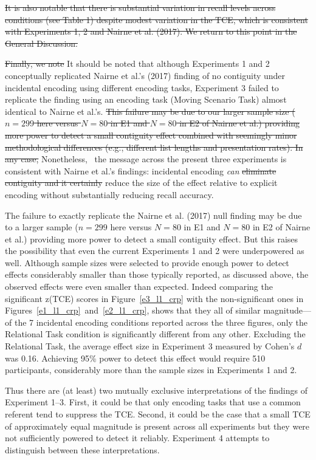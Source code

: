 \documentclass[man,natbib,floatsintext]{apa6} %
\begin{document}
\st{It is also notable that there is substantial variation in recall levels across conditions (see Table 1) despite modest variation in the TCE, which is consistent with Experiments 1, 2 and Nairne et al. (2017). We return to this point in the General Discussion.}

\st{Finally, we note} \color{red}It should be noted \color{black} that although Experiments 1 and 2 conceptually replicated Nairne et al.'s (2017) finding of no contiguity under incidental encoding using different encoding tasks, Experiment 3 failed to replicate the finding using an encoding task (Moving Scenario Task) almost identical to Nairne et al.'s. \st{This failure may be due to our larger sample size ($n=299$ here versus $N=80$ in E1 and $N=80$ in E2 of Nairne et al.) providing more power to detect a small contiguity effect combined with seemingly minor methodological differences (e.g., different list lengths and presentation rates). In any case,} \color{red}Nonetheless, \color{black}~the message across the present three experiments is consistent with Nairne et al.'s findings: incidental encoding \emph{can} \st{eliminate contiguity and it certainly} reduce the size of the effect relative to explicit encoding \color{red} without substantially reducing recall accuracy\color{black}. 

\color{red}
The failure to exactly replicate the Nairne et al. (2017) null finding may be due to a larger sample ($n=299$ here versus $N=80$ in E1 and $N=80$ in E2 of Nairne et al.) providing more power to detect a small contiguity effect. But this raises the possibility that even the current Experiments 1 and 2 were underpowered as well. Although sample sizes were selected to provide enough power to detect effects considerably smaller than those typically reported, as discussed above, the observed effects were even smaller than expected. Indeed comparing the significant z(TCE) scores in Figure~\ref{e3_l1_crp} with the non-significant ones in Figures~\ref{e1_l1_crp}~and~\ref{e2_l1_crp}, shows that they all of similar magnitude---of the 7 incidental encoding conditions reported across the three figures, only the Relational Task condition is significantly different from any other. \label{power}Excluding the Relational Task, the average effect size in Experiment 3 measured by Cohen's $d$ was 0.16. Achieving 95\% power to detect this effect would require 510 participants, considerably more than the sample sizes in Experiments 1 and 2. 

Thus there are (at least) two mutually exclusive interpretations of the findings of Experiment 1--3. First, it could be that only encoding tasks that use a common referent tend to suppress the TCE. Second, it could be the case that a small TCE of approximately equal magnitude is present across all experiments but they were not sufficiently powered to detect it reliably. Experiment 4 attempts to distinguish between these interpretations.
\end{document}
